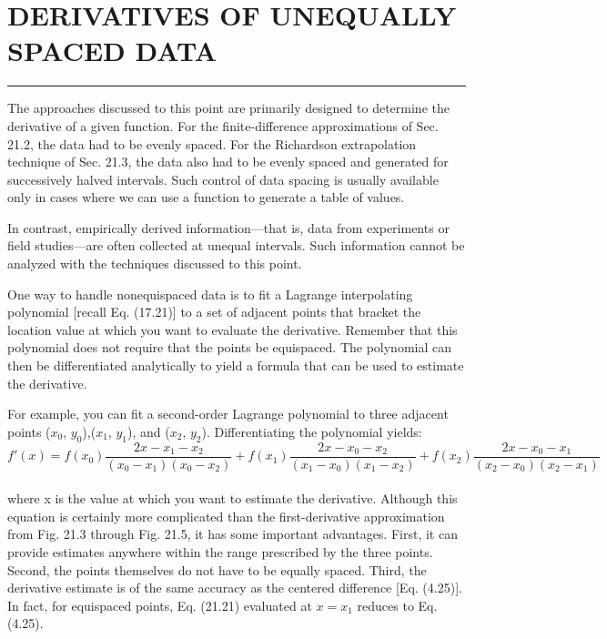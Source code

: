 \documentclass[../main.tex]{subfiles}
\begin{document}
\vspace{0,6in}
\section{DERIVATIVES OF UNEQUALLY SPACED DATA}
\vspace{0,1in}
\hrule
\vspace{0,1in}
The approaches discussed to this point are primarily designed to determine the derivative of
a given function. For the finite-difference approximations of Sec. 21.2, the data had to be
evenly spaced. For the Richardson extrapolation technique of Sec. 21.3, the data also had to
be evenly spaced and generated for successively halved intervals. Such control of data spacing is usually available only in cases where we can use a function to generate a table of values.

In contrast, empirically derived information—that is, data from experiments or field
studies—are often collected at unequal intervals. Such information cannot be analyzed
with the techniques discussed to this point.

One way to handle nonequispaced data is to fit a Lagrange interpolating polynomial
[recall Eq. (17.21)] to a set of adjacent points that bracket the location value at which you
want to evaluate the derivative. Remember that this polynomial does not require that the
points be equispaced. The polynomial can then be differentiated analytically to yield a formula that can be used to estimate the derivative.

For example, you can fit a second-order Lagrange polynomial to three adjacent points
($x_{0}$, $y_{0}$),($x_{1}$, $y_{1}$), and ($x_{2}$, $y_{2}$). Differentiating the polynomial yields:
\begin{equation}
	\tag{21.21}
	f'(x) = f(x_{0})\dfrac{2x - x_{1} - x_{2}}{(x_{0} - x_{1}) (x_{0} - x_{2})} + f(x_{1})\dfrac{2x - x_{0} - x_{2}}{(x_{1}-x_{0})(x_{1} - x_{2})} + f(x_{2})\dfrac{2x-x_{0} - x_{1}}{(x_{2} - x_{0}) (x_{2} - x_{1})}
\end{equation}\\
where x is the value at which you want to estimate the derivative. Although this equation is
certainly more complicated than the first-derivative approximation from Fig. 21.3 through
Fig. 21.5, it has some important advantages. First, it can provide estimates anywhere
within the range prescribed by the three points. Second, the points themselves do not have
to be equally spaced. Third, the derivative estimate is of the same accuracy as the centered
difference [Eq. (4.25)]. In fact, for equispaced points, Eq. (21.21) evaluated at $x = x_{1}$ reduces to Eq. (4.25).
\end{document}
